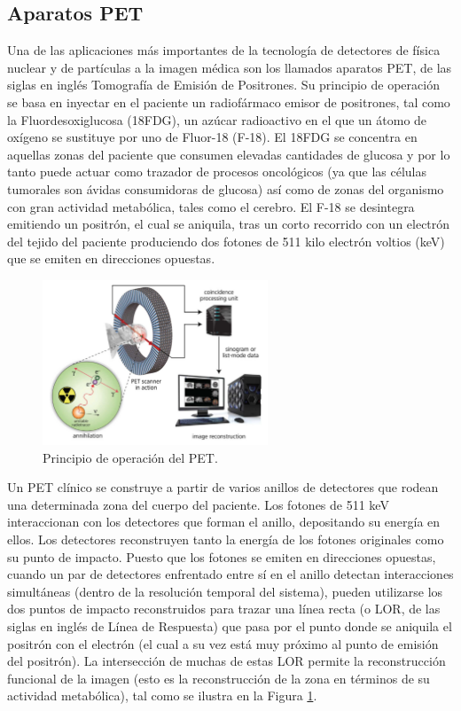 
\subsection*{Aparatos PET}

 Una de las aplicaciones más importantes de la tecnología de detectores de física nuclear y de partículas a la imagen médica son los llamados aparatos PET, de las siglas en inglés Tomografía de Emisión de Positrones. Su principio de operación se basa en inyectar en el paciente un radiofármaco emisor de positrones, tal como la Fluordesoxiglucosa (18FDG), un azúcar radioactivo en el que un átomo de oxígeno se sustituye por uno de Fluor-18 (F-18). El 18FDG se concentra en aquellas zonas del paciente que consumen elevadas cantidades de glucosa y por lo tanto puede actuar como trazador de procesos oncológicos (ya que las células tumorales son ávidas consumidoras de glucosa) así como de zonas del organismo con gran actividad metabólica, tales como el cerebro. El F-18 se desintegra emitiendo un positrón, el cual se aniquila, tras un corto recorrido con un electrón del tejido del paciente produciendo dos fotones de 511 kilo electrón voltios (keV) que se emiten en direcciones opuestas. 


\begin{figure}
\centering
\includegraphics[width=0.6\textwidth]{img/PET.jpg}
\caption{\small Principio de operación del PET.} \label{fig.PET}
\end{figure} 


Un PET clínico se construye a partir de varios anillos de detectores que rodean una determinada zona del cuerpo del paciente. Los fotones de 511 keV interaccionan con los detectores que forman el anillo, depositando su energía en ellos. Los detectores reconstruyen tanto la energía de los fotones originales como su punto de impacto. Puesto que los fotones se emiten en direcciones opuestas, cuando un par de detectores enfrentado entre sí en el anillo detectan interacciones simultáneas (dentro de la resolución temporal del sistema), pueden utilizarse los dos puntos de impacto reconstruidos para trazar una línea recta (o LOR, de las siglas en inglés de Línea de Respuesta) que pasa por el punto donde se aniquila el positrón con el electrón (el cual a su vez está muy próximo al punto de emisión del positrón). La intersección de muchas de estas LOR permite la reconstrucción funcional de la imagen (esto es la reconstrucción de la zona en términos de su actividad metabólica), tal como se ilustra en la Figura \ref{fig.PET}.

